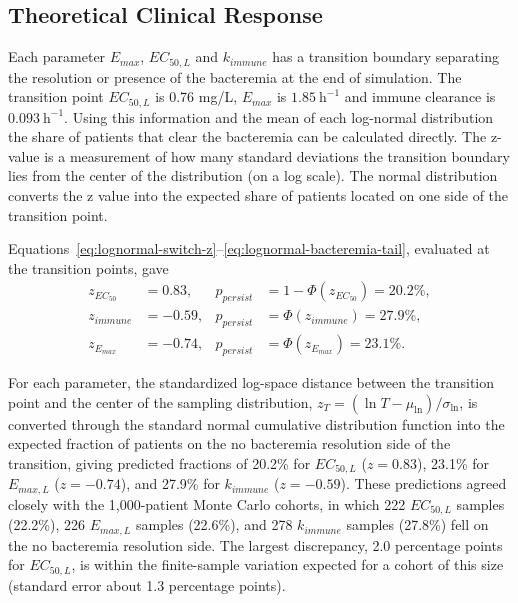 \documentclass[journal]{IEEEtran}
\begin{document}
\subsection{Theoretical Clinical Response}

Each parameter $E_{max}$, $EC_{50,L}$ and $k_{immune}$ has a transition boundary separating the resolution or presence of the bacteremia at the end of simulation.
The transition point $EC_{50,L}$ is 0.76 mg/L, $E_{max}$ is $1.85~\mathrm{h}^{-1}$ and immune clearance is  $0.093~\mathrm{h}^{-1}$.  Using this information and the mean of each log-normal distribution the share of patients that clear the bacteremia can be calculated directly.  The z-value is a measurement of how many standard deviations the transition boundary lies
from the center of the distribution (on a log scale).  The normal distribution converts the z value into the expected share of patients located on one side of the transition point.

Equations~\eqref{eq:lognormal-switch-z}--\eqref{eq:lognormal-bacteremia-tail}, evaluated at the
transition points, gave
\begin{equation}
\begin{aligned}
z_{EC_{50}} &= 0.83,  & p_{persist} &= 1-\Phi(z_{EC_{50}})=20.2\%,\\
z_{immune} &= -0.59, & p_{persist} &= \Phi(z_{immune})=27.9\%,\\
z_{E_{max}} &= -0.74, &
p_{persist} &= \Phi(z_{E_{max}})=23.1\%.
\end{aligned}
\label{eq:evaluated-persistence-tails}
\end{equation}

For each parameter, the standardized log-space distance between the transition point and the center of the sampling distribution, $z_T = (\ln T - \mu_{\ln})/\sigma_{\ln}$, is converted through the standard normal cumulative distribution function into the expected fraction of patients on the no bacteremia resolution side of the transition, giving predicted fractions of 20.2\% for $EC_{50,L}$ ($z = 0.83$), 23.1\% for $E_{max,L}$ ($z = -0.74$), and
27.9\% for $k_{immune}$ ($z = -0.59$). These predictions agreed closely with the 1,000-patient Monte Carlo cohorts, in which 222 $EC_{50,L}$ samples (22.2\%), 226 $E_{max,L}$ samples (22.6\%), and 278 $k_{immune}$ samples (27.8\%) fell on the no bacteremia resolution side. The largest discrepancy, 2.0 percentage points for $EC_{50,L}$, is within the finite-sample variation expected for a cohort of this size (standard error about 1.3 percentage points).
\end{document}
